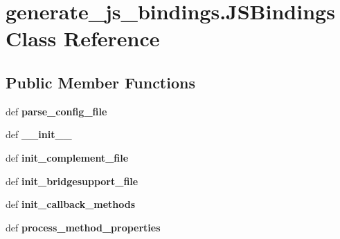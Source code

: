 \hypertarget{classgenerate__js__bindings_1_1_j_s_bindings}{\section{generate\-\_\-js\-\_\-bindings.\-J\-S\-Bindings Class Reference}
\label{classgenerate__js__bindings_1_1_j_s_bindings}
}
\subsection*{Public Member Functions}
\begin{DoxyCompactItemize}
\item 
\hypertarget{classgenerate__js__bindings_1_1_j_s_bindings_a1fbf50580f083d5a855bc94586758708}{def {\bfseries parse\-\_\-config\-\_\-file}}\label{classgenerate__js__bindings_1_1_j_s_bindings_a1fbf50580f083d5a855bc94586758708}

\item 
\hypertarget{classgenerate__js__bindings_1_1_j_s_bindings_a1c0bccbb7299f09f1e10a81a55452253}{def {\bfseries \-\_\-\-\_\-init\-\_\-\-\_\-}}\label{classgenerate__js__bindings_1_1_j_s_bindings_a1c0bccbb7299f09f1e10a81a55452253}

\item 
\hypertarget{classgenerate__js__bindings_1_1_j_s_bindings_af54d86a0547da8e9152827133129aa96}{def {\bfseries init\-\_\-complement\-\_\-file}}\label{classgenerate__js__bindings_1_1_j_s_bindings_af54d86a0547da8e9152827133129aa96}

\item 
\hypertarget{classgenerate__js__bindings_1_1_j_s_bindings_a2cd68487f5927ab8d4c1b30b4a25ce9c}{def {\bfseries init\-\_\-bridgesupport\-\_\-file}}\label{classgenerate__js__bindings_1_1_j_s_bindings_a2cd68487f5927ab8d4c1b30b4a25ce9c}

\item 
\hypertarget{classgenerate__js__bindings_1_1_j_s_bindings_ab7f79471395f5357b0c5b32d34c19beb}{def {\bfseries init\-\_\-callback\-\_\-methods}}\label{classgenerate__js__bindings_1_1_j_s_bindings_ab7f79471395f5357b0c5b32d34c19beb}

\item 
\hypertarget{classgenerate__js__bindings_1_1_j_s_bindings_a9577af0ef90c98ffdacba96269ddf12e}{def {\bfseries process\-\_\-method\-\_\-properties}}\label{classgenerate__js__bindings_1_1_j_s_bindings_a9577af0ef90c98ffdacba96269ddf12e}


\end{DoxyCompactItemize}

